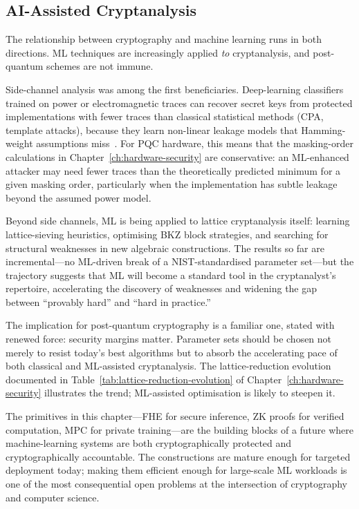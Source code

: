\subsection{AI-Assisted Cryptanalysis}
\label{subsec:ai-cryptanalysis}

The relationship between cryptography and machine learning runs in both directions.  ML techniques are increasingly applied \emph{to} cryptanalysis, and post-quantum schemes are not immune.

Side-channel analysis was among the first beneficiaries.  Deep-learning classifiers trained on power or electromagnetic traces can recover secret keys from protected implementations with fewer traces than classical statistical methods (CPA, template attacks), because they learn non-linear leakage models that Hamming-weight assumptions miss~\cite{MaghrebiBrierDanger2019}.  For PQC hardware, this means that the masking-order calculations in Chapter~\ref{ch:hardware-security} are conservative: an ML-enhanced attacker may need fewer traces than the theoretically predicted minimum for a given masking order, particularly when the implementation has subtle leakage beyond the assumed power model.

Beyond side channels, ML is being applied to lattice cryptanalysis itself: learning lattice-sieving heuristics, optimising BKZ block strategies, and searching for structural weaknesses in new algebraic constructions.  The results so far are incremental---no ML-driven break of a NIST-standardised parameter set---but the trajectory suggests that ML will become a standard tool in the cryptanalyst's repertoire, accelerating the discovery of weaknesses and widening the gap between ``provably hard'' and ``hard in practice.''

The implication for post-quantum cryptography is a familiar one, stated with renewed force: security margins matter.  Parameter sets should be chosen not merely to resist today's best algorithms but to absorb the accelerating pace of both classical and ML-assisted cryptanalysis.  The lattice-reduction evolution documented in Table~\ref{tab:lattice-reduction-evolution} of Chapter~\ref{ch:hardware-security} illustrates the trend; ML-assisted optimisation is likely to steepen it.

The primitives in this chapter---FHE for secure inference, ZK proofs for verified computation, MPC for private training---are the building blocks of a future where machine-learning systems are both cryptographically protected and cryptographically accountable.  The constructions are mature enough for targeted deployment today; making them efficient enough for large-scale ML workloads is one of the most consequential open problems at the intersection of cryptography and computer science.


